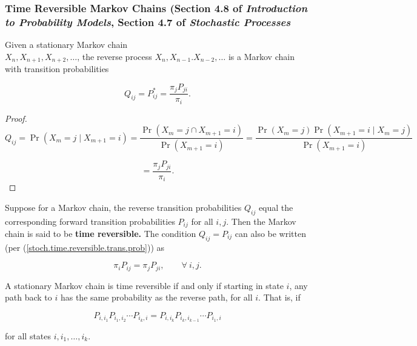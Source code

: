 \subsubsection{Time Reversible Markov Chains (Section 4.8 of \textit{Introduction to Probability Models}, Section 4.7 of \textit{Stochastic Processes}}

\begin{proposition}Given a stationary Markov chain \\ \(X_n, X_{n+1}, X_{n+2}, \ldots\), the reverse process \(X_n, X_{n-1}. X_{n-2}, \ldots\) is a Markov chain with transition probabilities

\[
Q_{ij} = P_{ij}^* = \frac{ \pi_j P_{ji}}{\pi_i}.
\]

\end{proposition}

\begin{proof}

\[
Q_{ij} = \Pr(X_m = j \mid X_{m+1} = i) = \frac{ \Pr(X_m = j \cap X_{m+1} = i) }{\Pr(X_{m+1} = i)} = \frac{ \Pr(X_m = j ) \Pr( X_{m+1} = i \mid X_m=j) }{\Pr(X_{m+1} = i)}
\]

\begin{equation}\label{stoch.time.reversible.trans.prob}
= \frac{\pi_j P_{ji}}{\pi_i}.
\end{equation}

\end{proof}

\begin{definition}Suppose for a Markov chain, the reverse transition probabilities \(Q_{ij}\) equal the corresponding forward transition probabilities \(P_{ij}\) for all \(i, j\). Then the Markov chain is said to be \textbf{time reversible.} The condition \(Q_{ij} = P_{ij}\) can also be written (per (\ref{stoch.time.reversible.trans.prob})) as

\[
\pi_i P_{ij} = \pi_j P_{ji}, \qquad \forall \ i,j.
\]

\end{definition}

\begin{theorem}A stationary Markov chain is time reversible if and only if starting in state \(i\), any path back to \(i\) has the same probability as the reverse path, for all \(i\). That is, if 

\[
P_{i,i_1}P_{i_1,i_2} \cdots P_{i_k,i} = P_{i,i_k} P_{i_k,i_{k-1}} \cdots P_{i_1, i}
\]

for all states \(i, i_1, \ldots, i_k\).

\end{theorem}

